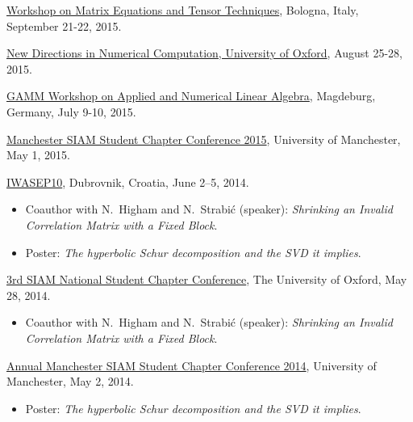\documentclass[10pt]{article}
\begin{document}
\begin{bibenum}

    \item \href{http://mett15.dm.unibo.it/}{Workshop on Matrix Equations and Tensor Techniques}, Bologna, Italy, September 21-22, 2015.

    \item \href{http://www2.maths.ox.ac.uk/new.direction2015/}{New Directions in Numerical Computation, University of Oxford}, August 25-28, 2015.

    \item \href{http://www.mpi-magdeburg.mpg.de/csc/events/GAMM-ANLA15}{GAMM Workshop on Applied and Numerical Linear Algebra}, Magdeburg, Germany, July 9-10, 2015.

    \item \href{http://www.maths.manchester.ac.uk/~siam/amsscc15/}{Manchester SIAM Student Chapter Conference 2015}, University of Manchester, May 1, 2015.

    \item \href{http://iwasep.fesb.hr/iwasep10/}{IWASEP10}, Dubrovnik, Croatia, June 2--5, 2014.
        \begin{itemize}
        \item Coauthor with N.\ Higham and N.\ Strabi\'{c} (speaker): \textit{Shrinking an Invalid Correlation Matrix with a Fixed Block}.
        \item Poster: \emph{The hyperbolic Schur decomposition and the SVD it implies}.
        \end{itemize}

    \item \href{http://www.siamoxford.com/snscc-2014/}{3rd SIAM National Student Chapter Conference}, The University of Oxford, May 28, 2014.
        \begin{itemize}
        \item Coauthor with N.\ Higham and N.\ Strabi\'{c} (speaker): \textit{Shrinking an Invalid Correlation Matrix with a Fixed Block}.
        \end{itemize}

    \item \href{http://www.maths.manchester.ac.uk/~siam/amsscc14.php}{Annual Manchester SIAM Student Chapter Conference 2014}, University of Manchester, May 2, 2014.
        \begin{itemize}
        \item Poster: \emph{The hyperbolic Schur decomposition and the SVD it implies}.
        \end{itemize}


\end{bibenum}
\end{document}
